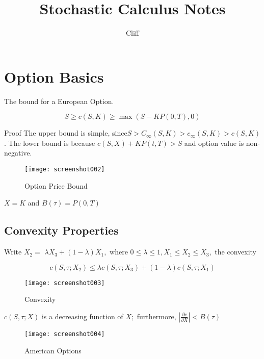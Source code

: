 \documentclass[a4]{article}
\title{Stochastic Calculus Notes}
\author{Cliff}
\begin{document}
\tableofcontents
\newpage
\maketitle
\section{Option Basics}
The bound for a European Option.\par 
$$
S \geq c(S,K) \geq \max (S-K P(0, T), 0)
$$
\par 
Proof
The upper bound is simple, since$S>C_{\infty}(S,K)>c_{\infty}(S,K)>c(S,K)$. The lower bound is because $c(S,X) + KP(t,T) >S$ and option value is non-negative.
\begin{figure}
	\centering
	\texttt{[image: screenshot002]}
	\caption{Option Price Bound}
	\label{fig:screenshot002}
\end{figure}
$X=K$ and $B(\tau ) = P(0,T)$
\subsection{Convexity Properties}
Write $X_{2}=$ $\lambda X_{3}+(1-\lambda) X_{1},$ where $0 \leq \lambda \leq 1, X_{1} \leq X_{2} \leq X_{3},$ the convexity\par 
$$
c\left(S, \tau ; X_{2}\right) \leq \lambda c\left(S, \tau ; X_{3}\right)+(1-\lambda) c\left(S, \tau ; X_{1}\right)
$$
\begin{figure}
	\centering
	\texttt{[image: screenshot003]}
	\caption{Convexity}
	\label{fig:screenshot003}
\end{figure}
$c(S, \tau ; X)$ is a decreasing function of $X ;$ furthermore, $\left|\frac{\partial c}{\partial X}\right|<B(\tau)$
\begin{figure}
	\centering
	\texttt{[image: screenshot004]}
	\caption{American Options}
	\label{fig:screenshot004}
\end{figure}
\end{document}
